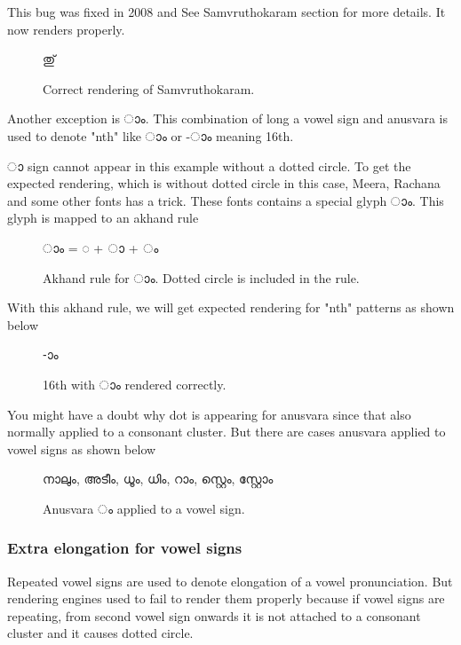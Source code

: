 This bug was fixed in 2008 and See Samvruthokaram section for more details. It 
now renders properly.

\begin{figure}[h]
  \centering
  {\meera\textexample തു്}\\
  \caption{Correct rendering of Samvruthokaram.}
\end{figure}

Another exception is {\malayalam ാം}. This combination of long a vowel sign and 
anusvara is used to denote "nth" like
{ാം} or  {-ാം} meaning 16th.

{\malayalam ാ} sign cannot appear in this example without a dotted circle.
To get the expected rendering, which is without dotted circle in this case, 
Meera, Rachana and some other fonts has a trick. These fonts contains a special 
glyph {\malayalam ാം}. This glyph is mapped to an akhand rule 

\begin{figure}[h]
  \centering
  {\meera\textexample  ാം = ◌ + ാ + ം}\\
  \caption{Akhand rule for {\malayalam ാം}. Dotted circle is included in the 
rule.}
\end{figure}

With this akhand rule, we will get expected rendering for "nth" patterns as 
shown below

\begin{figure}[h]
  \centering
  {\meera{}-ാം}\\
  \caption{16th with {\malayalam ാം} rendered correctly.}
\end{figure}

You might have a doubt why dot is appearing for anusvara since that also 
normally applied to a consonant cluster. But there are cases anusvara applied to 
vowel signs as shown below

\begin{figure}[h!]
  \centering
  {\meera\textexample നാലും, അടീം, ധൂം, ധിം, റാം, സ്റ്റെം, സ്റ്റോം}\\
  \caption{Anusvara {\malayalam ം} applied to a vowel sign.}
\end{figure}

\subsubsection{Extra elongation for vowel signs}

Repeated vowel signs are used to denote elongation of a vowel pronunciation. But rendering engines used to fail to render them properly
because if vowel signs are repeating, from second vowel sign onwards it is not attached to a consonant cluster and it causes dotted circle.

